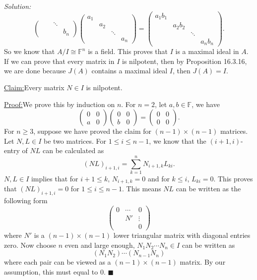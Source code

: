 \documentclass[a4paper, 12pt]{article}
\newenvironment{solution}
    {\textit{Solution:}}
    {}
\newenvironment{claim}[1]{\par\noindent\underline{Claim:}\space#1}{}
\newenvironment{claimproof}[1]{\par\noindent\underline{Proof:}\space#1}{\hfill $\blacksquare$}
\begin{document}
\begin{solution}
\[\begin{pmatrix}
    & & \ddots &  \\ 
    & & & b_n
\end{pmatrix}\begin{pmatrix}
    a_1& & &  \\ 
    &a_2& &  \\ 
    & & \ddots &  \\ 
    & & & a_n
\end{pmatrix}=\begin{pmatrix}
    a_1b_1& & &  \\ 
    &a_2b_2& &  \\ 
    & & \ddots &  \\ 
    & & & a_nb_n
\end{pmatrix}.\]
So we know that \(A/I\cong \mathbb{F}^n\) is a field. This proves that \(I\) is a maximal ideal in \(A\). If we can prove that every matrix in \(I\) is nilpotent, then by Proposition 16.3.16, we are done because \(J(A)\) contains a maximal ideal \(I\), then \(J(A)=I\). 
\begin{claim}
Every matrix \(N\in I\) is nilpotent. 
\end{claim}
\begin{claimproof}
We prove this by induction on \(n\). For \(n=2\), let \(a,b\in \mathbb{F}\), we have 
\[\begin{pmatrix}
    0&0\\ 
    a&0
\end{pmatrix}\begin{pmatrix}
    0&0\\ 
    b&0
\end{pmatrix}=\begin{pmatrix}
    0&0\\ 
    0&0
\end{pmatrix}.\]
For \(n\geq 3\), suppose we have proved the claim for \((n-1)\times (n-1)\) matrices. Let \(N,L\in I\) be two matrices. For \(1\leq i\leq n-1\), we know that the \((i+1,i)\)-entry of \(NL\) can be calculated as 
\[(NL)_{i+1,i}=\sum_{k=1}^{n}N_{i+1,k}L_{ki}.\]
\(N,L\in I\) implies that for \(i+1\leq k\), \(N_{i+1,k}=0\) and for \(k\leq i\), \(L_{ki}=0\). This proves that \((NL)_{i+1,i}=0\) for \(1\leq i\leq n-1\). This means \(NL\) can be written as the following form 
\[\begin{pmatrix}
    0 &\cdots&0\\ 
    &N'&\vdots\\ 
    & & 0
\end{pmatrix}\]
where \(N'\) is a \((n-1)\times (n-1)\) lower triangular matrix with diagonal entries zero. Now choose \(n\) even and large enough, \(N_1N_2\cdots N_n\in I\) can be written as 
\[(N_1N_2)\cdots (N_{n-1}N_n)\]
where each pair can be viewed as a \((n-1)\times (n-1)\) matrix. By our assumption, this must equal to \(0\).
\end{claimproof}
\end{solution}
\end{document}
